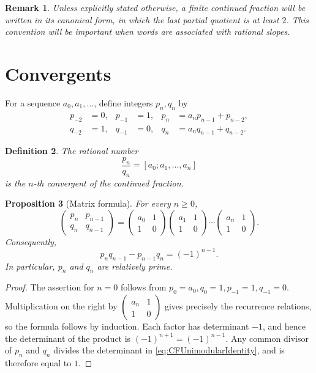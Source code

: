 \documentclass{book}
\newtheorem{definition}{Definition}[section]
\newtheorem{proposition}[definition]{Proposition}
\newtheorem{remark}[definition]{Remark}
\begin{document}
\begin{remark}
  Unless explicitly stated otherwise, a finite continued fraction will be
  written in its \textnormal{canonical form}, in which the last partial
  quotient is at least \(2\). This convention will be important when words
  are associated with rational slopes.
\end{remark}

\section{Convergents}

For a sequence \(a_0,a_1,\ldots\), define integers \(p_n,q_n\) by
\begin{align*}
  p_{-2}&=0, & p_{-1}&=1,
  & p_n&=a_np_{n-1}+p_{n-2},\\
  q_{-2}&=1, & q_{-1}&=0,
  & q_n&=a_nq_{n-1}+q_{n-2}.
\end{align*}

\begin{definition}
  The rational number
  \[
    \frac{p_n}{q_n}=[a_0;a_1,\ldots,a_n]
  \]
  is the \(n\)-th \textnormal{convergent} of the continued fraction.
\end{definition}

\begin{proposition}[Matrix formula]\label{prop:CFMatrixFormula}
  For every \(n\geq0\),
  \[
    \begin{pmatrix}
      p_n&p_{n-1}\\
      q_n&q_{n-1}
    \end{pmatrix}
    =
    \begin{pmatrix}a_0&1\\1&0\end{pmatrix}
    \begin{pmatrix}a_1&1\\1&0\end{pmatrix}
    \cdots
    \begin{pmatrix}a_n&1\\1&0\end{pmatrix}.
  \]
  Consequently,
  \begin{equation}\label{eq:CFUnimodularIdentity}
    p_nq_{n-1}-p_{n-1}q_n=(-1)^{n-1}.
  \end{equation}
  In particular, \(p_n\) and \(q_n\) are relatively prime.
\end{proposition}

\begin{proof}
  The assertion for \(n=0\) follows from
  \(p_0=a_0,q_0=1,p_{-1}=1,q_{-1}=0\). Multiplication on the right by
  \(
    \left(\begin{smallmatrix}a_n&1\\1&0\end{smallmatrix}\right)
  \)
  gives precisely the recurrence relations, so the formula follows by
  induction. Each factor has determinant \(-1\), and hence the determinant
  of the product is \((-1)^{n+1}=(-1)^{n-1}\). Any common divisor of \(p_n\)
  and \(q_n\) divides the determinant in
  \eqref{eq:CFUnimodularIdentity}, and is therefore equal to \(1\).
\end{proof}
\end{document}
